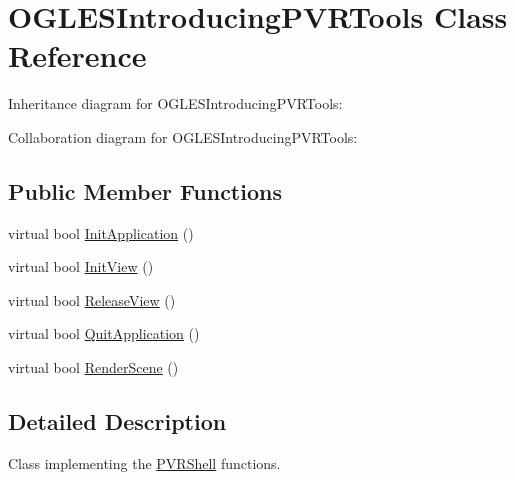 \hypertarget{class_o_g_l_e_s_introducing_p_v_r_tools}{\section{O\+G\+L\+E\+S\+Introducing\+P\+V\+R\+Tools Class Reference}
\label{class_o_g_l_e_s_introducing_p_v_r_tools}
}


Inheritance diagram for O\+G\+L\+E\+S\+Introducing\+P\+V\+R\+Tools\+:


Collaboration diagram for O\+G\+L\+E\+S\+Introducing\+P\+V\+R\+Tools\+:
\subsection*{Public Member Functions}
\begin{DoxyCompactItemize}
\item 
virtual bool \hyperlink{class_o_g_l_e_s_introducing_p_v_r_tools_a70c2685ca0096ccd872f4627d851c0b1}{Init\+Application} ()
\item 
virtual bool \hyperlink{class_o_g_l_e_s_introducing_p_v_r_tools_ab567957dbd5f8d5f41cb46ac30cea80b}{Init\+View} ()
\item 
virtual bool \hyperlink{class_o_g_l_e_s_introducing_p_v_r_tools_a4aceb520f92909c3518374b904a95534}{Release\+View} ()
\item 
virtual bool \hyperlink{class_o_g_l_e_s_introducing_p_v_r_tools_ab09d7080fee7b12cf8ff45d88539faab}{Quit\+Application} ()
\item 
virtual bool \hyperlink{class_o_g_l_e_s_introducing_p_v_r_tools_a93616f1d655b6b7be929ce3481fe3fd6}{Render\+Scene} ()
\end{DoxyCompactItemize}


\subsection{Detailed Description}


 Class implementing the \hyperlink{class_p_v_r_shell}{P\+V\+R\+Shell} functions. 

